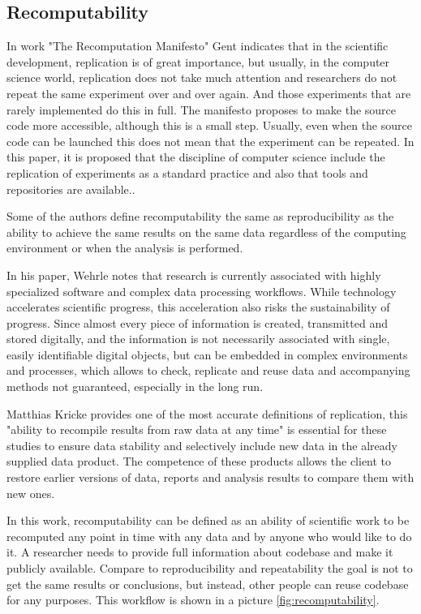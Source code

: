 \documentclass{vldb}
\begin{document}
\subsection{Recomputability}
In work "The Recomputation Manifesto"\cite{DBLP:journals/corr/abs-1304-3674} Gent indicates that in the scientific development, replication is of great importance, but usually, in the computer science world, replication does not take much attention and researchers do not repeat the same experiment over and over again. And those experiments that are rarely implemented do this in full. The manifesto proposes to make the source code more accessible, although this is a small step. Usually, even when the source code can be launched this does not mean that the experiment can be repeated. In this paper, it is proposed that the discipline of computer science include the replication of experiments as a standard practice and also that tools and repositories are available..\par
Some of the authors\cite{DBLP:conf/psb/KaushikISTDK17} define recomputability the same as reproducibility as the ability to achieve the same results on the same data regardless of the computing environment or when the analysis is performed.\par
In his paper\cite{DBLP:conf/ucc/WehrleLVR14}, Wehrle notes that research is currently associated with highly specialized software and complex data processing workflows. While technology accelerates scientific progress, this acceleration also risks the sustainability of progress. Since almost every piece of information is created, transmitted and stored digitally, and the information is not necessarily associated with single, easily identifiable digital objects, but can be embedded in complex environments and processes, which allows to check, replicate and reuse data and accompanying methods not guaranteed, especially in the long run.\par
Matthias Kricke\cite{DBLP:journals/dbsk/KrickeGS17} provides one of the most accurate definitions of replication, this "ability to recompile results from raw data at any time" is essential for these studies to ensure data stability and selectively include new data in the already supplied data product. The competence of these products allows the client to restore earlier versions of data, reports and analysis results to compare them with new ones.\par
In this work, recomputability can be defined as an ability of scientific work to be recomputed any point in time with any data and by anyone who would like to do it. A researcher needs to provide full information about codebase and make it publicly available. Compare to reproducibility and repeatability the goal is not to get the same results or conclusions, but instead, other people can reuse codebase for any purposes. This workflow is shown in a picture \ref{fig:recomputability}.\par
\end{document}
